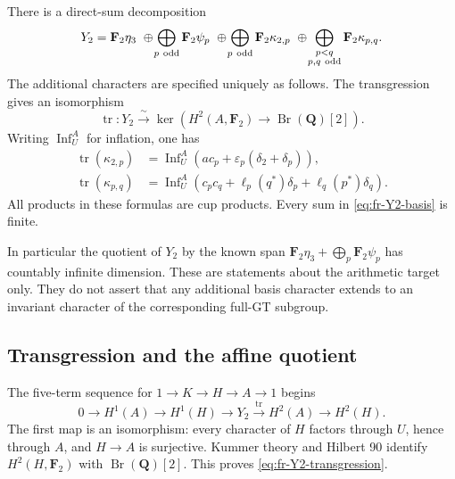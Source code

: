 \begin{theorem}\label{thm:fr-Y2-complete}
There is a direct-sum decomposition
\begin{equation}\label{eq:fr-Y2-basis}
 Y_2=
 \mathbf F_2\eta_3
 \ \oplus\!
 \bigoplus_{p\ {\rm odd}}\mathbf F_2\psi_p
 \ \oplus\!
 \bigoplus_{p\ {\rm odd}}\mathbf F_2\kappa_{2,p}
 \ \oplus\!
 \bigoplus_{\substack{p<q\\p,q\ {\rm odd}}}
                     \mathbf F_2\kappa_{p,q}.
\end{equation}
The additional characters are specified uniquely as follows.
The transgression gives an isomorphism
\begin{equation}\label{eq:fr-Y2-transgression}
 \operatorname{tr}:Y_2
 \xrightarrow{\ \sim\ }
 \ker\!\left(H^2(A,\mathbf F_2)
                   \longrightarrow\operatorname{Br}(\mathbf Q)[2]\right).
\end{equation}
Writing \(\operatorname{Inf}_U^A\) for inflation, one has
\begin{align}
 \operatorname{tr}(\kappa_{2,p})
 &=\operatorname{Inf}_U^A
       \left(a c_p+\varepsilon_p(\delta_2+\delta_p)\right),
                                                        \label{eq:fr-Y2-k2p}\\
 \operatorname{tr}(\kappa_{p,q})
 &=\operatorname{Inf}_U^A
       \left(c_pc_q+\ell_p(q^*)\delta_p
                       +\ell_q(p^*)\delta_q\right).
                                                        \label{eq:fr-Y2-kpq}
\end{align}
All products in these formulas are cup products.
Every sum in \eqref{eq:fr-Y2-basis} is finite.

In particular the quotient of \(Y_2\) by the known span
\(\mathbf F_2\eta_3+\bigoplus_p\mathbf F_2\psi_p\)
has countably infinite dimension.
These are statements about the arithmetic target only.
They do not assert that any additional basis character
extends to an invariant character of the corresponding full-GT subgroup.
\end{theorem}

\subsection{Transgression and the affine quotient}

The five-term sequence for \(1\to K\to H\to A\to1\) begins
\[
 0\longrightarrow H^1(A)
 \longrightarrow H^1(H)
 \longrightarrow Y_2
 \xrightarrow{\operatorname{tr}}H^2(A)
 \longrightarrow H^2(H).
\]
The first map is an isomorphism: every character of \(H\) factors
through \(U\), hence through \(A\), and \(H\to A\) is surjective.
Kummer theory and Hilbert 90 identify
\(H^2(H,\mathbf F_2)\) with \(\operatorname{Br}(\mathbf Q)[2]\).
This proves \eqref{eq:fr-Y2-transgression}.

